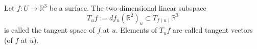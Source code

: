 Let $f: U \to \mathbb{R}^3$ be a surface. The two-dimensional linear subspace
$$T_u f := df_u(\mathbb{R}^2)_u \subset T_{f(u)} \mathbb{R}^3$$
is called the tangent space of $f$ at $u$. Elements of $T_u f$ are called tangent vectors (of $f$ at $u$).
